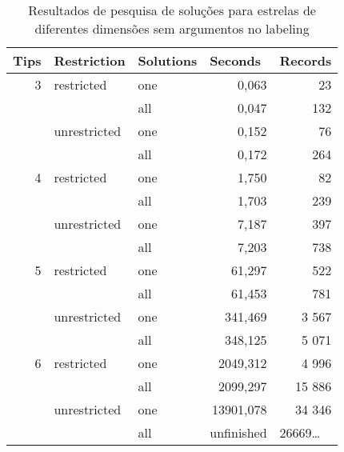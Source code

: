 \begin{table}[htbp]
  \centering
  \caption{Resultados de pesquisa de soluções para estrelas de diferentes dimensões sem argumentos no labeling}
    \begin{tabular}{rrlll}
    \hline
    \multicolumn{1}{l}{Tips} & \multicolumn{1}{l}{Restriction} & Solutions & Seconds & Records \\ \hline\hline
    3     & \multicolumn{1}{l}{restricted} & one   & \multicolumn{1}{r}{0,063} & \multicolumn{1}{r}{23} \\
          &       & all   & \multicolumn{1}{r}{0,047} & \multicolumn{1}{r}{132} \\
          & \multicolumn{1}{l}{unrestricted} & one   & \multicolumn{1}{r}{0,152} & \multicolumn{1}{r}{76} \\
          &       & all   & \multicolumn{1}{r}{0,172} & \multicolumn{1}{r}{264} \\
    4     & \multicolumn{1}{l}{restricted} & one   & \multicolumn{1}{r}{1,750} & \multicolumn{1}{r}{82} \\
          &       & all   & \multicolumn{1}{r}{1,703} & \multicolumn{1}{r}{239} \\
          & \multicolumn{1}{l}{unrestricted} & one   & \multicolumn{1}{r}{7,187} & \multicolumn{1}{r}{397} \\
          &       & all   & \multicolumn{1}{r}{7,203} & \multicolumn{1}{r}{738} \\
    5     & \multicolumn{1}{l}{restricted} & one   & \multicolumn{1}{r}{61,297} & \multicolumn{1}{r}{522} \\
          &       & all   & \multicolumn{1}{r}{61,453} & \multicolumn{1}{r}{781} \\
          & \multicolumn{1}{l}{unrestricted} & one   & \multicolumn{1}{r}{341,469} & \multicolumn{1}{r}{3 567} \\
          &       & all   & \multicolumn{1}{r}{348,125} & \multicolumn{1}{r}{5 071} \\
    6     & \multicolumn{1}{l}{restricted} & one   & \multicolumn{1}{r}{2049,312} & \multicolumn{1}{r}{4 996} \\
          &       & all   & \multicolumn{1}{r}{2099,297} & \multicolumn{1}{r}{15 886} \\
          & \multicolumn{1}{l}{unrestricted} & one   & \multicolumn{1}{r}{13901,078} & \multicolumn{1}{r}{34 346} \\
          &       & all   & unfinished & 26669… \\ \hline
    \end{tabular}%
  \label{tab:rmv_unwanted_bt}%
\end{table}%